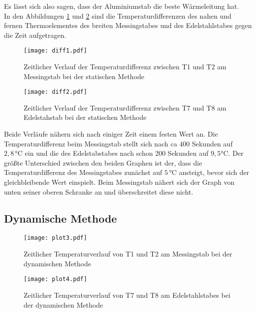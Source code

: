 \noindent Es lässt sich also sagen, dass der Aluminiumstab die beste Wärmeleitung hat.\\


\noindent In den Abbildungen \ref{fig:c} und \ref{fig:d} sind die Temperaturdifferenzen des nahen und fernen Thermoelementes des breiten
Messingstabes und des Edelstahlstabes gegen die Zeit aufgetragen.
\begin{figure}[H]
  \centering
  \texttt{[image: diff1.pdf]}
  \caption{Zeitlicher Verlauf der Temperaturdifferenz zwischen T1 und T2 am Messingstab bei der statischen Methode}
  \label{fig:c}
\end{figure}

\begin{figure}[H]
  \centering
  \texttt{[image: diff2.pdf]}
  \caption{Zeitlicher Verlauf der Temperaturdifferenz zwischen T7 und T8 am Edelstahstab bei der statischen Methode}
  \label{fig:d}
\end{figure}

\noindent Beide Verläufe nähern sich nach einiger Zeit einem festen Wert an. Die Temperaturdifferenz beim Messingstab
stellt sich nach ca 400 Sekunden auf  $2,8\,\si{\celsius}$ ein und die des Edelstabstabes nach schon 200 Sekunden auf $9,5\si{\celsius}$.
Der größte Unterschied zwischen den beiden Graphen ist der, dass die Temperaturdifferenz des Messingstabes zunächst auf $5\,\si{\celsius}$ ansteigt, bevor sich der
gleichbleibende Wert einspielt. Beim Messingstab nähert sich der Graph von unten seiner oberen Schranke an und überschreitet diese nicht.


\subsection{Dynamische Methode}
\begin{figure}[H]
  \centering
  \texttt{[image: plot3.pdf]}
  \caption{Zeitlicher Temperaturverlauf von T1 und T2 am Messingstab bei der dynamischen Methode}
  \label{fig:e}
\end{figure}


\begin{figure}[H]
  \centering
  \texttt{[image: plot4.pdf]}
  \caption{Zeitlicher Temperaturverlauf von T7 und T8 am Edelstahlstabes bei der dynamischen Methode}
  \label{fig:f}
\end{figure}


